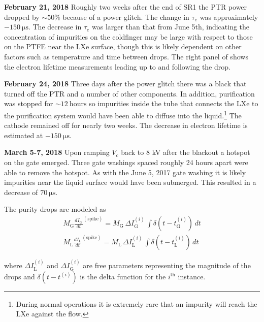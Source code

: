 \textbf{February 21, 2018}  Roughly two weeks after the end of SR1 the PTR power dropped by ${\sim} 50\%$ because of a power glitch.  The
change in $\tau_e$ was approximately $-150\ \mathrm{\mu s}$.  The decrease in $\tau_e$ was larger than that from June 5th, indicating the
concentration of impurities on the
coldfinger may be large with respect to those on the PTFE near the LXe surface, though this is likely dependent on other factors such as
temperature and time between drops.  The right panel of  shows the
electron lifetime measurements leading up to and following the drop.

\textbf{February 24, 2018}  Three days after the power glitch there was a black that turned off the PTR and a number of other
components.  In addition, purification was stopped for ${\sim}12\ \mathrm{hours}$ so impurities inside the tube that connects the LXe to the
purification system would have been able to diffuse into the liquid.\footnote{During normal operations it is extremely rare that an
impurity will reach the LXe against the flow.}  The cathode remained off for nearly two weeks.  The decrease in electron lifetime is
estimated at $-150\ \mathrm{\mu s}$.

\textbf{March 5-7, 2018}  Upon ramping $V_c$ back to 8 kV after the blackout a hotspot on the gate emerged.  Three gate washings spaced
roughly 24 hours apart were able to remove the hotspot.  As with the June 5, 2017 gate washing it is likely impurities near the liquid
surface would have been submerged.  This resulted in a decrease of $70\ \mathrm{\mu s}$.

The purity drops are modeled as
\vspace{-10pt}
\begin{subequations}
\begin{align}
M_{\mathrm{G}} \frac{dI_{\mathrm{G}}}{dt}^{(\mathrm{spike})} = M_{\mathrm{G}}\, \Delta I_{\mathrm{G}}^{(i)}\,
\int \delta (t - t_{\mathrm{G}}^{(i)})\, dt
\\
M_{\mathrm{L}}\frac{dI_{\mathrm{L}}}{dt}^{(\mathrm{spike})} = M_{\mathrm{L}}\, \Delta I_{\mathrm{L}}^{(i)}\,
\int \delta (t - t_{\mathrm{L}}^{(i)})\, dt
\end{align}
\end{subequations}

\vspace{-10pt}

\noindent where $\Delta I_{\mathrm{L}}^{(i)}$ and $\Delta I_{\mathrm{G}}^{(i)}$ are free parameters representing the magnitude of the
drops and $\delta (t - t^{(i)})$ is the delta function for the $i^{\mathrm{th}}$ instance.

